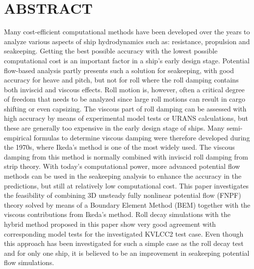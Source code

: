 \section*{ABSTRACT}\label{abstract}

\quad Many cost-efficient computational methods have been developed over the
years to analyze various aspects of ship hydrodynamics such as:
resistance, propulsion and seakeeping. Getting the best possible
accuracy with the lowest possible computational cost is an important
factor in a ship's early design stage. Potential flow-based analysis
partly presents such a solution for seakeeping, with good accuracy for
heave and pitch, but not for roll where the roll damping contains both
inviscid and viscous effects. Roll motion is, however, often a critical
degree of freedom that needs to be analyzed since large roll motions can
result in cargo shifting or even capsizing. The viscous part of roll
damping can be assessed with high accuracy by means of experimental
model tests or URANS calculations, but these are generally too expensive
in the early design stage of ships. Many semi-empirical formulas to
determine viscous damping were therefore developed during the 1970s,
where Ikeda's method is one of the most widely used. The viscous damping
from this method is normally combined with inviscid roll damping from
strip theory. With today's computational power, more advanced potential
flow methods can be used in the seakeeping analysis to enhance the
accuracy in the predictions, but still at relatively low computational
cost. This paper investigates the feasibility of combining 3D unsteady
fully nonlinear potential flow (FNPF) theory solved by means of a
Boundary Element Method (BEM) together with the viscous contributions
from Ikeda's method. Roll decay simulations with the hybrid method
proposed in this paper show very good agreement with corresponding model
tests for the investigated KVLCC2 test case. Even though this approach
has been investigated for such a simple case as the roll decay test and
for only one ship, it is believed to be an improvement in seakeeping
potential flow simulations.

\quad     